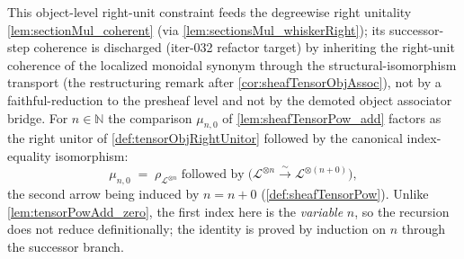 \begin{lemma}
  \label{lem:tensorPowAdd_rightUnit}
  This object-level right-unit constraint feeds the degreewise right unitality
  \cref{lem:sectionMul_coherent} (via \cref{lem:sectionsMul_whiskerRight}); its
  successor-step coherence is discharged (iter-032 refactor target) by inheriting
  the right-unit coherence of the localized monoidal synonym through the
  structural-isomorphism transport (the restructuring remark after
  \cref{cor:sheafTensorObjAssoc}), not by a faithful-reduction to the presheaf
  level and not by the demoted object associator bridge.
  For \(n \in \mathbb{N}\) the comparison \(\mu_{n,0}\) of
  \cref{lem:sheafTensorPow_add} factors as the right unitor of
  \cref{def:tensorObjRightUnitor} followed by the canonical index-equality
  isomorphism:
  \[
    \mu_{n,0}
      \;=\;
      \rho_{\mathcal{L}^{\otimes n}}
      \;\textrm{followed by}\;
      \bigl(\mathcal{L}^{\otimes n}
        \xrightarrow{\ \sim\ } \mathcal{L}^{\otimes (n+0)}\bigr),
  \]
  the second arrow being induced by \(n = n+0\) (\cref{def:sheafTensorPow}).
  Unlike \cref{lem:tensorPowAdd_zero}, the first index here is the \emph{variable}
  \(n\), so the recursion does not reduce definitionally; the identity is proved by
  induction on \(n\) through the successor branch.
\end{lemma}

